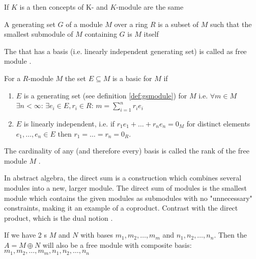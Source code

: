 \begin{appendices}
\begin{example}[Module]
  If $K$ is a  then concepts of
  K- and $K$-module are the same
\end{example}

\begin{definition}
  A generating set $G$ of a module $M$ over a ring $R$ is a subset of
  $M$ such that the smallest submodule of $M$ containing $G$ is $M$
  itself \cite{wiki:gsmodule}
  \label{def:gsmodule}
\end{definition}

\begin{definition}
  The  that has a basis (i.e. linearly independent
  generating set) 
  is called as free module \cite{wiki:freemodule}.

  For a $R$-module $M$ the set $E \subseteq M$ is a basic for $M$ if
  \begin{enumerate}
  \item $E$ is a generating set (see definition \ref{def:gsmodule})
    for $M$ i.e. $\forall m \in M$ 
    $\exists n < \infty$: $\exists e_i \in E, r_i \in R$:
    $m = \sum_{i = 1}^n r_i e_i$
  \item $E$ is linearly independent, i.e. if $r_1 e_1 + \dots + r_n
    e_n = 0_M$ for distinct elements $e_1, \dots, e_n \in E$ then
    $r_1 = \dots = r_n = 0_R$.
  \end{enumerate}
  \label{def:freemodule}
\end{definition}

\begin{definition}
  The cardinality of any (and therefore every) basis is called the
  rank of the free module $M$ \cite{wiki:freemodule}.
  \label{def:rankfreemodule}
\end{definition}

\begin{definition}
  In abstract algebra, the direct sum is a construction which combines
  several modules into a new, larger module. The direct sum of modules
  is the smallest module which contains the given modules as
  submodules with no "unnecessary" constraints, making it an example
  of a coproduct. Contrast with the direct product, which is the dual
  notion \cite{wiki:directsummodules}.
  \label{def:directsummodules}
\end{definition}

\begin{example}
  If we have 2 s $M$ and $N$ with bases $m_1,
  m_2, \dots, m_m$ and $n_1, n_2, \dots, n_n$. Then the
   $A = M \oplus N$ will also be a free
  module with composite basis: $m_1, m_2, \dots, m_m, n_1, n_2, \dots, n_n$
  \label{ex:directsummodules}
\end{example}


\end{appendices}
